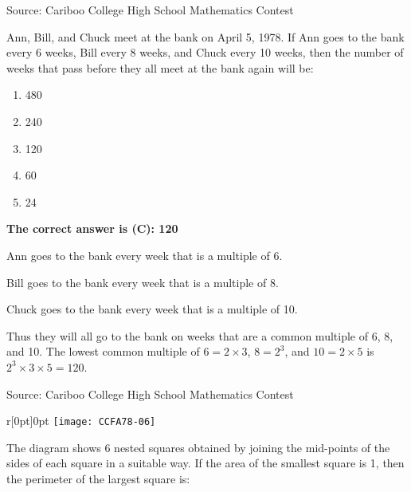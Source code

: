 \documentclass{article}
\begin{document}

\scriptsize
Source: Cariboo College High School Mathematics Contest

\normalsize
Ann, Bill, and Chuck meet at the bank on April 5, 1978. If Ann goes to the bank every 6 weeks, Bill every 8 weeks, and Chuck every 10 weeks, then the number of weeks that pass before they all meet at the bank again will be:
\begin{enumerate}[noitemsep,topsep=0mm,leftmargin=*,widest=D,label=\Alph*)]
	\item 480
	\item 240
	\item 120
	\item 60
	\item 24
\end{enumerate}

\textbf{The correct answer is (C): 120}

Ann goes to the bank every week that is a multiple of 6.

Bill goes to the bank every week that is a multiple of 8.

Chuck goes to the bank every week that is a multiple of 10.

Thus they will all go to the bank on weeks that are a common multiple of 6, 8, and 10. The lowest common multiple of $6=2\times 3$, $8=2^3$, and $10=2 \times 5$ is $2^3 \times 3 \times 5 = 120$.

\vskip 1.5cm


\scriptsize
Source: Cariboo College High School Mathematics Contest

\normalsize
\begin{wrapfigure}[4]{r}[0pt]{0pt}
	\texttt{[image: CCFA78-06]}
\end{wrapfigure}
The diagram shows 6 nested squares obtained by joining the mid-points of the sides of each square in a suitable way. If the area of the smallest square is 1, then the perimeter of the largest square is:
\end{document}
